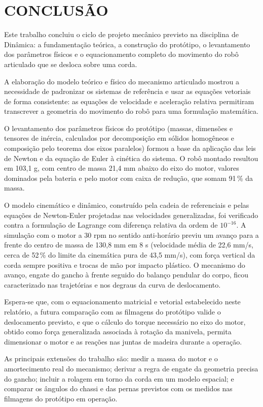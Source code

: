 \chapter{CONCLUSÃO}
\label{chapter:conclusao}

Este trabalho concluiu o ciclo de projeto mecânico previsto na disciplina de Dinâmica: a fundamentação teórica, a construção do protótipo, o levantamento dos parâmetros físicos e o equacionamento completo do movimento do robô articulado que se desloca sobre uma corda.

A elaboração do modelo teórico e físico do mecanismo articulado mostrou a necessidade de padronizar os sistemas de referência e usar as equações vetoriais de forma consistente: as equações de velocidade e aceleração relativa permitiram transcrever a geometria do movimento do robô para uma formulação matemática.

O levantamento dos parâmetros físicos do protótipo (massas, dimensões e tensores de inércia, calculados por decomposição em sólidos homogêneos e composição pelo teorema dos eixos paralelos) formou a base da aplicação das leis de Newton e da equação de Euler à cinética do sistema. O robô montado resultou em 103,1 g, com centro de massa 21,4 mm abaixo do eixo do motor, valores dominados pela bateria e pelo motor com caixa de redução, que somam 91\,\% da massa.

O modelo cinemático e dinâmico, construído pela cadeia de referenciais e pelas equações de Newton-Euler projetadas nas velocidades generalizadas, foi verificado contra a formulação de Lagrange com diferença relativa da ordem de $10^{-16}$. A simulação com o motor a 30 rpm no sentido anti-horário previu um avanço para a frente do centro de massa de 130,8 mm em 8 s (velocidade média de 22,6 mm/s, cerca de 52\,\% do limite da cinemática pura de 43,5 mm/s), com força vertical da corda sempre positiva e trocas de mão por impacto plástico. O mecanismo do avanço, engate do gancho à frente seguido do balanço pendular do corpo, ficou caracterizado nas trajetórias e nos degraus da curva de deslocamento.

Espera-se que, com o equacionamento matricial e vetorial estabelecido neste relatório, a futura comparação com as filmagens do protótipo valide o deslocamento previsto, e que o cálculo do torque necessário no eixo do motor, obtido como força generalizada associada à rotação da manivela, permita dimensionar o motor e as reações nas juntas de madeira durante a operação.

As principais extensões do trabalho são: medir a massa do motor e o amortecimento real do mecanismo; derivar a regra de engate da geometria precisa do gancho; incluir a rolagem em torno da corda em um modelo espacial; e comparar os ângulos do chassi e das pernas previstos com os medidos nas filmagens do protótipo em operação.
